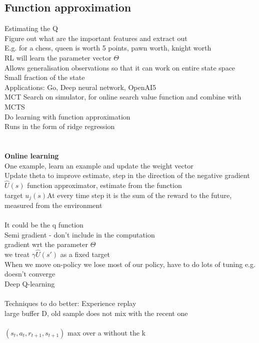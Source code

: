 \documentclass[11pt]{article}
\begin{document}
\subsection*{Function approximation}
Estimating the Q\\
Figure out what are the important features and extract out\\
E.g. for a chess, queen is worth 5 points, pawn worth, knight worth\\
RL will learn the parameter vector $\Theta$
\\
Allows generalisation observations so that it can work on entire state space\\
Small fraction of the state\\
Applications: Go, Deep neural network, OpenAI5
\\
MCT Search on simulator, for online search value function and combine with MCTS
\\
Do learning with function approximation\\
Runs in the form of ridge regression\\\\\\
\textbf{Online learning}\\
One example, learn an example and update the weight vector\\
Update theta to improve estimate, step in the direction of the negative gradient
\\
$\hat{U}(s)$ function approximator, estimate from the function\\
target $u_{j}(s)$At every time step it is the sum of the reward to the future, measured from the environment\\\\
It could be the q function\\
Semi gradient - don't include in the computation\\
gradient wrt the parameter $\Theta$\\
we treat $\gamma\hat{U}(s')$ as a fixed target
\\
When we move on-policy we lose most of our policy, have to do lots of tuning e.g. doesn't converge
\\
Deep Q-learning\\\\
Techniques to do better: Experience replay\\
large buffer D, old sample does not mix with the recent one\\\\
$(s_t, a_t, r_{t+1}, s_{t+1})$ max over a without the k\\
\end{document}
